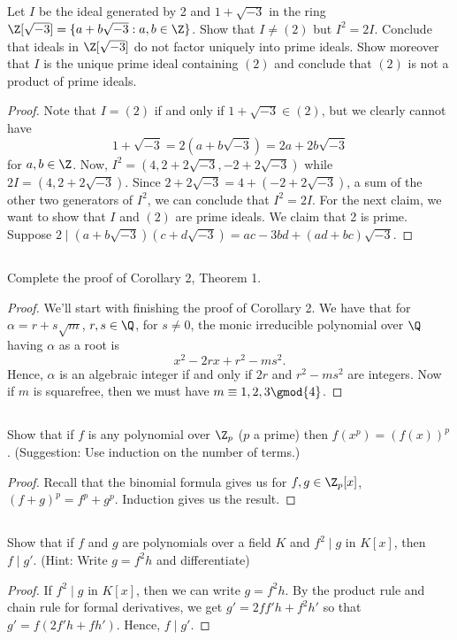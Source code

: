 \documentclass[letter,12pt]{article}
\begin{document}
\subsection{} Let $I$ be the ideal generated by 2 and $1+\sqrt{-3}$ in the ring $\Z[\sqrt{-3}]=\{a+b\sqrt{-3} : a,b\in \Z\}$. Show that $I\ne (2)$ but $I^2=2I$. Conclude that ideals in $\Z[\sqrt{-3}]$ do not factor uniquely into prime ideals. Show moreover that $I$ is the unique prime ideal containing $(2)$ and conclude that $(2)$ is not a product of prime ideals.
\begin{proof}
    Note that $I=(2)$ if and only if $1+\sqrt{-3}\in (2)$, but we clearly cannot have
    \[
        1+\sqrt{-3}=2(a+b\sqrt{-3})=2a+2b\sqrt{-3}
    \]
    for $a,b\in \Z$. Now, $I^2=(4,2+2\sqrt{-3},-2+2\sqrt{-3})$ while $2I=(4,2+2\sqrt{-3})$. Since $2+2\sqrt{-3}=4+(-2+2\sqrt{-3})$, a sum of the other two generators of $I^2$, we can conclude that $I^2=2I$. For the next claim, we want to show that $I$ and $(2)$ are prime ideals. We claim that 2 is prime. Suppose $2\mid (a+b\sqrt{-3})(c+d\sqrt{-3})=ac-3bd+(ad+bc)\sqrt{-3}$.
\end{proof}
\subsection{} Complete the proof of Corollary 2, Theorem 1.
\begin{proof}
We'll start with finishing the proof of Corollary 2. We have that for $\alpha=r+s\sqrt{m}$, $r,s\in \Q$, for $s\ne 0$, the monic irreducible polynomial over $\Q$ having $\alpha$ as a root is
\[
x^2-2rx+r^2-ms^2.
\]
Hence, $\alpha$ is an algebraic integer if and only if $2r$ and $r^2-m s^2$ are integers. Now if $m$ is squarefree, then we must have $m\equiv 1,2,3\gmod{4}$. 
\end{proof}
\subsection{}
\subsection{} Show that if $f$ is any polynomial over $\Z_p$ ($p$ a prime) then $f(x^p)=(f(x))^p$. (Suggestion: Use induction on the number of terms.)
\begin{proof}
    Recall that the binomial formula gives us for $f,g\in \Z_p[x]$, $(f+g)^p=f^p+g^p$. Induction gives us the result.
\end{proof}

\subsection{} Show that if $f$ and $g$ are polynomials over a field $K$ and $f^2\mid g$ in $K[x]$, then $f\mid g'$. (Hint: Write $g=f^2h$ and differentiate)
\begin{proof}
    If $f^2\mid g$ in $K[x]$, then we can write $g=f^2h$. By the product rule and chain rule for formal derivatives, we get $g'=2ff'h+f^2h'$ so that $g'=f(2f'h+fh')$. Hence, $f\mid g'$.
\end{proof}
\end{document}
